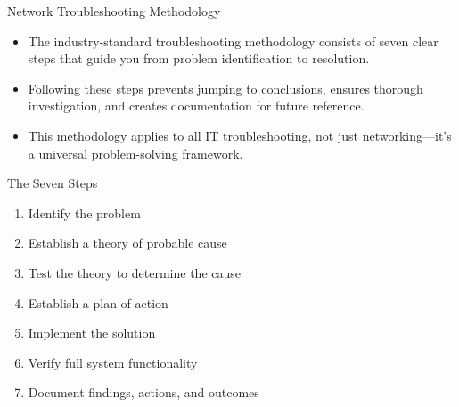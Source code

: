 \documentclass[aspectratio=169]{beamer}
\begin{document}
\begin{frame}{Network Troubleshooting Methodology}

\begin{itemize}
    \item The industry-standard troubleshooting methodology consists of seven clear steps that guide you from problem identification to resolution.
    \item Following these steps prevents jumping to conclusions, ensures thorough investigation, and creates documentation for future reference.
    \item This methodology applies to all IT troubleshooting, not just networking—it's a universal problem-solving framework.
\end{itemize}

\vspace{0.2cm}

\begin{block}{The Seven Steps}
	\scriptsize
\begin{enumerate}
    \item Identify the problem
    \item Establish a theory of probable cause
    \item Test the theory to determine the cause
    \item Establish a plan of action
    \item Implement the solution
    \item Verify full system functionality
    \item Document findings, actions, and outcomes
\end{enumerate}
\end{block}

\end{frame}
\end{document}
